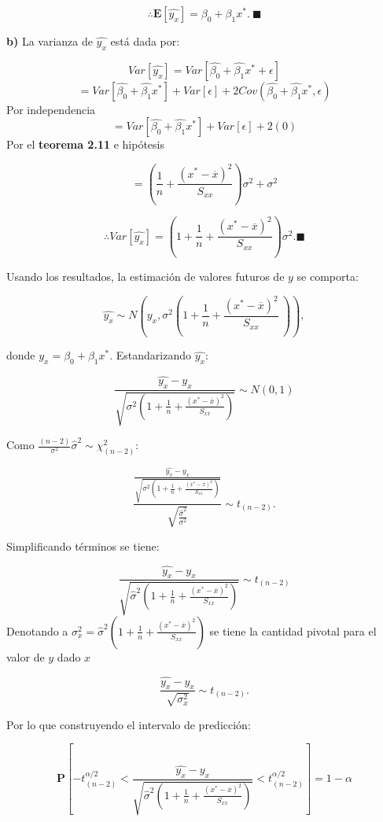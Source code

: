 \documentclass[
  a4paper,
  oneside,
  openany]{book}
\begin{document}
\[\therefore \mathbf{E}\left[\hat{y_{x}}\right]=\beta_{0}+\beta_{1}x^*. \ \blacksquare\]

\textbf{b)} La varianza de \(\hat{y_{x}}\) está dada por:

\[Var\left[\hat{y_{x}}\right]=Var\left[\hat{\beta_{0}}+\hat{\beta_{1}}x^*+\epsilon\right]\]
\[=Var\left[\hat{\beta_{0}}+\hat{\beta_{1}}x^*\right]+Var\left[\epsilon\right]+2Cov(\hat{\beta_{0}}+\hat{\beta_{1}}x^*,\epsilon)\]
Por independencia
\[=Var\left[\hat{\beta_{0}}+\hat{\beta_{1}}x^*\right]+Var\left[\epsilon\right]+2(0)\]
Por el \textbf{teorema 2.11} e hipótesis

\[=\left(\frac{1}{n}+\frac{(x^*-\overline{x})^2}{S_{xx}}\right)\sigma^2+\sigma^2\]

\[\therefore Var\left[\hat{y_{x}}\right]=\left(1+ \frac{1}{n}+\frac{(x^*-\overline{x})^2}{S_{xx}}\right)\sigma^2. \blacksquare\]

Usando los resultados, la estimación de valores futuros de \(y\) se comporta:

\[\hat{y_{x}} \sim N \left(y_{x},\sigma^2\left(1+ \frac{1}{n}+\frac{(x^*-\overline{x})^2}{S_{xx}} \ \right)\right),\]

donde \(y_{x}=\beta_{0}+\beta_{1}x^*.\) Estandarizando \(\hat{y_{x}}:\)

\[\frac{\hat{y_{x}}-y_{x}}{\sqrt{\sigma^2\left(1+ \frac{1}{n}+\frac{(x^*-\overline{x})^2}{S_{xx}}\right)}}\sim N (0,1)\]

Como \(\frac{(n-2)}{\sigma^2}\hat{\sigma}^2 \sim \chi^2_{(n-2)}\):

\[\frac{\frac{\hat{y_{x}}-y_{x}}{\sqrt{\sigma^2\left(1+ \frac{1}{n}+\frac{(x^*-\overline{x})^2}{S_{xx}}\right)}}}{\sqrt{\frac{\hat{\sigma}^2}{\sigma^2}}}\sim t_{(n-2)}.\]

Simplificando términos se tiene:

\[\frac{\hat{y_{x}}-y_{x}}{\sqrt{\hat{\sigma}^2\left(1+ \frac{1}{n}+\frac{(x^*-\overline{x})^2}{S_{xx}}\right)}}\sim t_{(n-2)}\]
Denotando a \(\sigma^2_{x}=\hat{\sigma}^2\left(1+ \frac{1}{n}+\frac{(x^*-\overline{x})^2}{S_{xx}}\right)\) se tiene la cantidad pivotal para el valor de \(y\) dado \(x\)

\[\frac{\hat{y_{x}}-y_{x}}{\sqrt{\sigma_{x}^2}}\sim t_{(n-2)}.\]

Por lo que construyendo el intervalo de predicción:

\[\mathbf{P}\left[-t^{\alpha/2}_{(n-2)}<\frac{\hat{y_{x}}-y_{x}}{\sqrt{\hat{\sigma}^2\left(1+ \frac{1}{n}+\frac{(x^*-\overline{x})^2}{S_{xx}}\right)}}<t^{\alpha/2}_{(n-2)}\right]=1-\alpha\]
\end{document}
